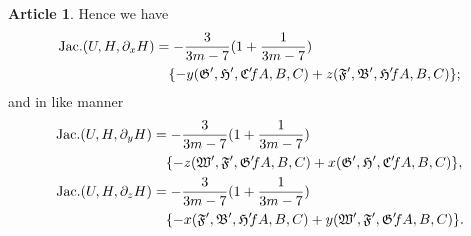 \documentclass[12pt,a4paper]{article}
\theoremstyle{definition}
\newtheorem{art}{Article}[section]
\DeclareMathOperator{\Jac}{Jac.}
\begin{document}
\begin{art}
Hence we have
\begin{align*}
\Jac(U, H, \partial_x H) &= -\frac{3}{3m - 7}(1 + \frac{1}{3m - 7}) \\
&\quad \{-y(\mathfrak{G}', \mathfrak{H}', \mathfrak{C}' \hspace{-2pt} fA, B, C) + z(\mathfrak{F}', \mathfrak{B}', \mathfrak{H}' \hspace{-2pt} fA, B, C)\};
\end{align*}
and in like manner
\begin{align*}
\Jac(U, H, \partial_y H) &= -\frac{3}{3m - 7}(1 + \frac{1}{3m - 7}) \\
&\quad \{-z(\mathfrak{W}', \mathfrak{F}', \mathfrak{G}' \hspace{-2pt} fA, B, C) + x(\mathfrak{G}', \mathfrak{H}', \mathfrak{C}' \hspace{-2pt} fA, B, C)\}, \\
\Jac(U, H, \partial_z H) &= -\frac{3}{3m - 7}(1 + \frac{1}{3m - 7}) \\
&\quad \{-x(\mathfrak{F}', \mathfrak{B}', \mathfrak{H}' \hspace{-2pt} fA, B, C) + y(\mathfrak{W}', \mathfrak{F}', \mathfrak{G}' \hspace{-2pt} fA, B, C)\}.
\end{align*}
\end{art}
\end{document}
